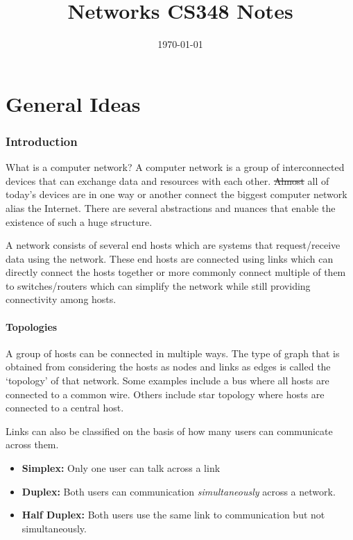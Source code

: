 \documentclass[12pt]{article}
\title{Networks CS348 Notes}
\author{}
\date{\today}
\newcommand{\tbox}[1]{\noindent\fbox{\parbox{\textwidth}{#1}}}
\begin{document}
\tableofcontents
\maketitle
\setlength{\parskip}{6pt}
\setlength{\parindent}{0pt}


\noindent\tbox{
    \begin{center}
    \textbf{\Huge Lecture 1}
    \end{center}
}
\part{General Ideas}
\section{Introduction}
What is a computer network? A computer network is a group of interconnected devices that can exchange data and resources with each other.
\st{Almost} all of today's devices are in one way or another connect the biggest computer network alias the Internet. There are several 
abstractions and nuances that enable the existence of such a huge structure.

A network consists of several end hosts which are systems that request/receive data using the network. These end hosts are connected 
using links which can directly connect the hosts together or more commonly connect multiple of them to switches/routers which can 
simplify the network while still providing connectivity among hosts. 

\subsection{Topologies}

A group of hosts can be connected in multiple ways. The type of graph that is obtained from considering the 
hosts as nodes and links as edges is called the `topology' of that network. 
Some examples include a bus where all hosts are connected to a common wire. Others include star topology where hosts are connected to a central host. 

Links can also be classified on the basis of how many users can communicate across them.
\begin{itemize}
    \item \textbf{Simplex:} Only one user can talk across a link
    \item \textbf{Duplex:} Both users can communication \textit{simultaneously} across a network. 
    \item \textbf{Half Duplex:} Both users use the same link to communication but not simultaneously. 
\end{itemize}
\end{document}
